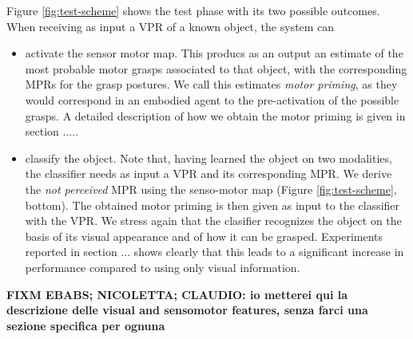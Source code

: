 Figure \ref{fig:test-scheme} shows the test phase with its two possible outcomes. When receiving as input a VPR of a known object, the system can
\begin{itemize}
\item activate the sensor motor map. This producs as an output an estimate of the most probable motor grasps associated to that object, with the corresponding 
MPRs for the grasp postures. We call this estimates {\em motor priming}, as they would correspond in an embodied agent to the pre-activation of the possible 
grasps. A detailed description of how we obtain the motor priming is given in section .....

\item classify the object. Note that, having learned the object on two modalities, the classifier needs as input a VPR and its corresponding MPR. We derive the
{\em not perceived} MPR using the senso-motor map (Figure \ref{fig:test-scheme}, bottom). The obtained motor priming is then given as input to the classifier with the VPR. We stress again that the clasifier recognizes the object on the basis of its visual appearance and of how it can be grasped. Experiments
reported in section ... shows clearly that this leads to a significant increase in performance compared to using only visual information.

\end{itemize}

{\bf FIXM EBABS; NICOLETTA; CLAUDIO: io metterei qui la descrizione delle visual and sensomotor features, senza farci una sezione specifica per ognuna}
